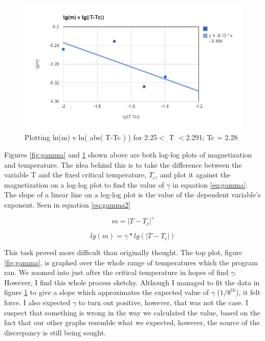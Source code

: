 \documentclass[a4paper,twoside,12pt]{article}
\begin{document}
\begin{figure}[h]
\centering
\includegraphics[scale=0.7]{Figures/gamma2.png}
\caption{Plotting ln(m) v ln( abs( T-Tc ) ) for 2.25$<$ T $<$2.291; Tc = 2.28}
\label{fig:gamma2}
\end{figure} 

\noindent Figures \ref{fig:gamma} and \ref{fig:gamma2} shown above are both log-log plots of magnetization and temperature. The idea behind this is to take the difference between the variable T and the fixed critical temperature, $T_{c}$, and plot it against the magnetization on a log-log plot to find the value of $\gamma$ in equation \ref{eq:gamma}. The slope of a linear line on a log-log plot is the value of the dependent variable's exponent. Seen in equation \ref{eq:gamma2}

\begin{equation}
\label{eq:gamma}
m = |{T-T_{c}}|^{\gamma}
\end{equation}

\begin{equation}
\label{eq:gamma2}
lg(m) = \gamma * lg(|{T-T_{c}}|)
\end{equation}


\noindent This task proved more difficult than originally thought. The top plot, figure \ref{fig:gamma}, is graphed over the whole range of temperatures which the program ran. We zoomed into just after the critical temperature in hopes of find $\gamma$. However, I find this whole process sketchy. Although I managed to fit the data in figure \ref{fig:gamma2} to give a slope which approximates the expected value of $\gamma$ ($1/8^{th}$), it felt force. I also expected $\gamma$ to turn out positive, however, that was not the case. I suspect that something is wrong in the way we calculated the value, based on the fact that our other graphs resemble what we expected, however, the source of the discrepancy is still being sought. 
\end{document}

